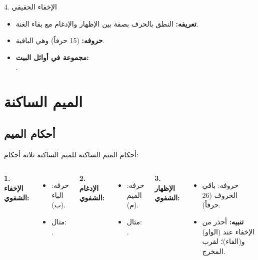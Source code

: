 \documentclass[aspectratio=169, 12pt]{beamer}
\begin{document}
\begin{frame}{4. الإخفاء الحقيقي}
    \begin{itemize}
        \item \textbf{تعريفه:} النطق بالحرف بصفة بين الإظهار والإدغام مع بقاء الغنة.
        \item \textbf{حروفه:} (15 حرفاً) وهي الباقية.
        \item \textbf{مجموعة في أوائل البيت:}
        \\ .
    \end{itemize}
\end{frame}

\section{الميم الساكنة}
\subsection{أحكام الميم}

\begin{frame}{أحكام الميم الساكنة}
    للميم الساكنة ثلاثة أحكام:
    \vspace{0.3cm}
    \begin{columns}[t]
        \textbf{1. الإخفاء الشفوي:}
        \begin{itemize}
            \item حرفه: الباء (ب).
            \item مثال: .
        \end{itemize}
        \vspace{0.3cm}
        \textbf{2. الإدغام الشفوي:}
        \begin{itemize}
            \item حرفه: الميم (م).
            \item مثال: .
        \end{itemize}

        \textbf{3. الإظهار الشفوي:}
        \begin{itemize}
            \item حروفه: باقي الحروف (26 حرفاً).
            \item \textbf{تنبيه:} أحذر من الإخفاء عند (الواو) و(الفاء)؛ لقرب المخرج.
        \end{itemize}
    \end{columns}
\end{frame}
\end{document}

